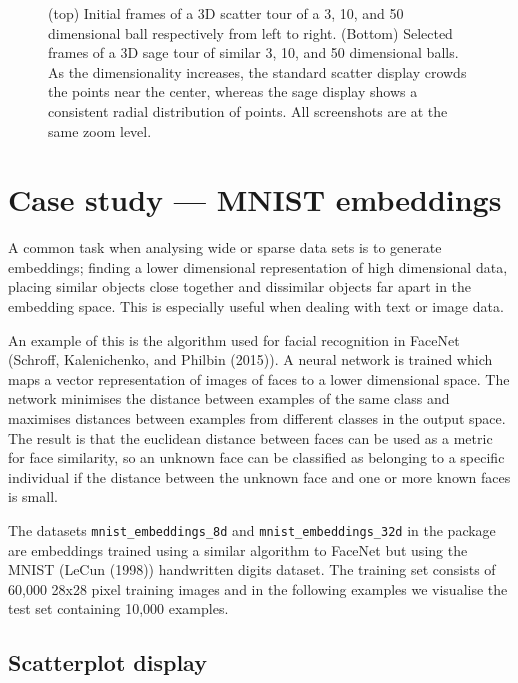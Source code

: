 \begin{figure}
{}

\caption{(top) Initial frames of a 3D scatter tour of a 3, 10, and 50 dimensional ball respectively from left to right. (Bottom) Selected frames of a 3D sage tour of similar 3, 10, and 50 dimensional balls. As the dimensionality increases, the standard scatter display crowds the points near the center, whereas the sage display shows a consistent radial distribution of points. All screenshots are at the same zoom level.}\label{fig:sage-sphere}
\end{figure}

\hypertarget{case-study-mnist-embeddings}{%
\section{Case study --- MNIST embeddings}\label{case-study-mnist-embeddings}}

A common task when analysing wide or sparse data sets is to generate embeddings; finding a lower dimensional representation of high dimensional data, placing similar objects close together and dissimilar objects far apart in the embedding space. This is especially useful when dealing with text or image data.

An example of this is the algorithm used for facial recognition in FaceNet (Schroff, Kalenichenko, and Philbin (2015)). A neural network is trained which maps a vector representation of images of faces to a lower dimensional space. The network minimises the distance between examples of the same class and maximises distances between examples from different classes in the output space. The result is that the euclidean distance between faces can be used as a metric for face similarity, so an unknown face can be classified as belonging to a specific individual if the distance between the unknown face and one or more known faces is small.

The datasets \texttt{mnist\_embeddings\_8d} and \texttt{mnist\_embeddings\_32d} in the  package are embeddings trained using a similar algorithm to FaceNet but using the MNIST (LeCun (1998)) handwritten digits dataset. The training set consists of 60,000 28x28 pixel training images and in the following examples we visualise the test set containing 10,000 examples.

\hypertarget{scatterplot-display}{%
\subsection{Scatterplot display}\label{scatterplot-display}}

